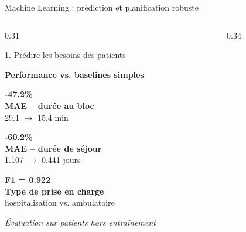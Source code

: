 \documentclass[aspectratio=169,11pt]{beamer}
\begin{document}
\begin{frame}{Machine Learning : prédiction et planification robuste}
	
	\vspace{-0.45cm}
	
	\begin{columns}[T,onlytextwidth]
		
		\begin{column}{0.31\textwidth}
			
			\begin{block}{1. Prédire les besoins des patients}
				\scriptsize
				
				\textbf{Performance vs. baselines simples}
				
				\vspace{0.18cm}
				
				{\Large\color{mcmPrimary}\textbf{-47.2\%}}\\
				\textbf{MAE -- durée au bloc}\\
				29.1 $\rightarrow$ 15.4 min
				
				\vspace{0.2cm}
				
				{\Large\color{mcmPrimary}\textbf{-60.2\%}}\\
				\textbf{MAE -- durée de séjour}\\
				1.107 $\rightarrow$ 0.441 jours
				
				\vspace{0.25cm}
				
				{\Large\color{mcmPrimary}\textbf{F1 = 0.922}}\\
				\textbf{Type de prise en charge}\\
				hospitalisation vs. ambulatoire
				
				\vspace{0.30cm}
				
				\textit{Évaluation sur patients hors entraînement}
				
			\end{block}
			
		\end{column}
		
		
		\begin{column}{0.34\textwidth}
			

\end{column}
\end{columns}
\end{frame}
\end{document}
